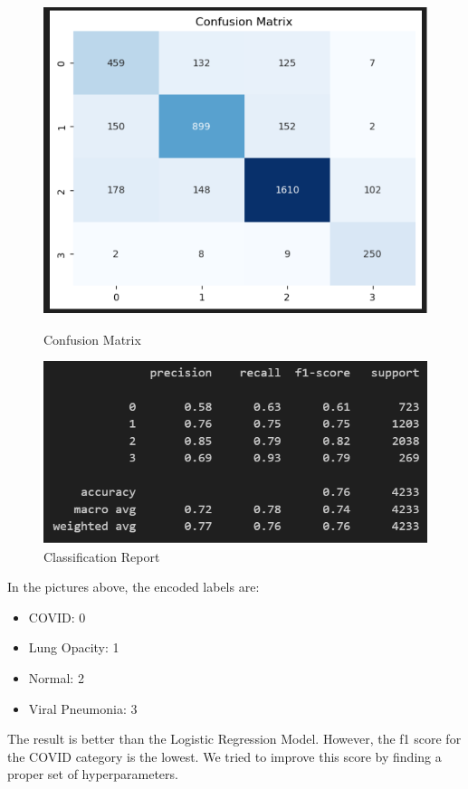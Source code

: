 \documentclass{article}
\begin{document}
\begin{figure}[H]
    \centering
    \begin{minipage}[t]{0.48\textwidth}
        \centering
        \includegraphics[width=\linewidth]{CM_RF_default.png}
        \caption{Confusion Matrix}
        \label{fig:confusion_rf_default}
    \end{minipage}
    \hfill
    \begin{minipage}[t]{0.48\textwidth}
        \centering
        \includegraphics[width=\linewidth]{CR_RF_default.png}
        \caption{Classification Report}
        \label{fig:classification_rf_default}
    \end{minipage}
\end{figure}
In the pictures above, the encoded labels are:
\begin{itemize}
    \item COVID: 0
    \item Lung Opacity: 1
    \item Normal: 2
    \item Viral Pneumonia: 3
\end{itemize}
The result is better than the Logistic Regression Model. However, the f1 score for the COVID category is the lowest. We tried to improve this score by finding a proper set of hyperparameters. 
\end{document}
